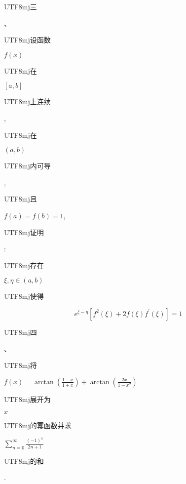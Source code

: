 \documentclass[10pt]{article}
\begin{document}
\begin{CJK}{UTF8}{mj}三\end{CJK}、\begin{CJK}{UTF8}{mj}设函数\end{CJK} $f(x)$ \begin{CJK}{UTF8}{mj}在\end{CJK} $[a, b]$ \begin{CJK}{UTF8}{mj}上连续\end{CJK}, \begin{CJK}{UTF8}{mj}在\end{CJK} $(a, b)$ \begin{CJK}{UTF8}{mj}内可导\end{CJK}, \begin{CJK}{UTF8}{mj}且\end{CJK} $f(a)=f(b)=1$, \begin{CJK}{UTF8}{mj}证明\end{CJK}: \begin{CJK}{UTF8}{mj}存在\end{CJK} $\xi, \eta \in(a, b)$ \begin{CJK}{UTF8}{mj}使得\end{CJK}
$$
e^{\xi-\eta}\left[f^{2}(\xi)+2 f(\xi) f^{\prime}(\xi)\right]=1
$$
\begin{CJK}{UTF8}{mj}四\end{CJK}、\begin{CJK}{UTF8}{mj}将\end{CJK} $f(x)=\arctan \left(\frac{1-x}{1+x}\right)+\arctan \left(\frac{2 x}{1-x^{2}}\right)$ \begin{CJK}{UTF8}{mj}展开为\end{CJK} $x$ \begin{CJK}{UTF8}{mj}的幂函数并求\end{CJK} $\sum_{n=0}^{\infty} \frac{(-1)^{n}}{2 n+1}$ \begin{CJK}{UTF8}{mj}的和\end{CJK}.
\end{document}
